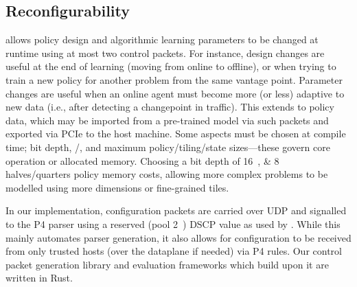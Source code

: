 

\subsection{Reconfigurability}
\approachshort{} allows policy design and algorithmic learning parameters to be changed at runtime using at most two control packets.
For instance, design changes are useful at the end of learning (moving from online to offline), or when trying to train a new policy for another problem from the same vantage point.
Parameter changes are useful when an online agent must become more (or less) adaptive to new data (i.e., after detecting a changepoint in traffic).
This extends to policy data, which may be imported from a pre-trained model via such packets and exported via PCIe to the host machine.
Some aspects must be chosen at compile time; bit depth, \Coopfw/\Indfw, and maximum policy/tiling/state sizes---these govern core operation or allocated memory.
Choosing a bit depth of \qtylist[list-pair-separator = { or }]{16;8}{\bit} halves/quarters policy memory costs, allowing more complex problems to be modelled using more dimensions or fine-grained tiles.

In our implementation, configuration packets are carried over UDP and signalled to the P4 parser using a reserved (pool 2~\parencite{rfc2474}) DSCP value as used by \textcite{DBLP:conf/isca/LiLYCSH19}.
While this mainly automates parser generation, it also allows for configuration to be received from only trusted hosts (over the dataplane if needed) via P4 rules.
Our control packet generation library and evaluation frameworks which build upon it are written in Rust.

